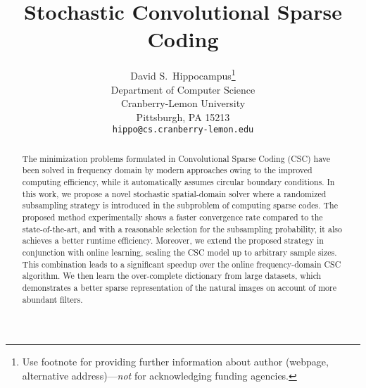 \documentclass{article}
\title{Stochastic Convolutional Sparse Coding}
\author{
  David S.~Hippocampus\thanks{Use footnote for providing further
    information about author (webpage, alternative
    address)---\emph{not} for acknowledging funding agencies.} \\
  Department of Computer Science\\
  Cranberry-Lemon University\\
  Pittsburgh, PA 15213 \\
  \texttt{hippo@cs.cranberry-lemon.edu} \\
}
\begin{document}

\maketitle

\begin{abstract}
The minimization problems formulated in Convolutional Sparse Coding (CSC) have been solved in frequency domain by modern approaches owing to the improved computing efficiency, while it automatically assumes circular boundary conditions. In this work, we propose a novel stochastic spatial-domain solver where a randomized subsampling strategy is introduced in the subproblem of computing sparse codes. The proposed method experimentally shows a faster convergence rate compared to the state-of-the-art, and with a reasonable selection for the subsampling probability, it also achieves a better runtime efficiency. Moreover, we extend the proposed strategy in conjunction with online learning, scaling the CSC model up to arbitrary sample sizes. This combination leads to a significant speedup over the online frequency-domain CSC algorithm. We then learn the over-complete dictionary from large datasets, which demonstrates a better sparse representation of the natural images on account of more abundant filters.
\end{abstract}











{\small


}


\clearpage
\appendix


\end{document}
